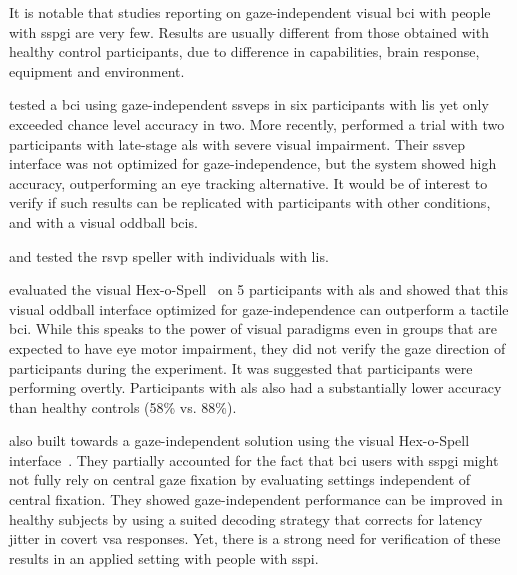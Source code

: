 \documentclass[twocolumn]{article}
\begin{document}
It is notable that studies reporting on
gaze-independent visual \ac{bci} with people with \ac{sspgi} are very few.
Results are usually different from those obtained with healthy control
participants, due to difference in capabilities, brain
response, equipment and environment.

\textcite{Lesenfants2014} tested a \ac{bci} using gaze-independent \acp{ssvep} in six
participants with \ac{lis} yet only exceeded chance level accuracy in two.
More recently, \textcite{Peters2020} performed a trial with two
participants with late-stage \ac{als} with severe visual impairment.
Their \ac{ssvep} interface was not optimized for gaze-independence, but the
system showed high accuracy, outperforming an eye tracking alternative.
It would be of interest to verify if such results can be replicated with
participants with other conditions, and with a visual oddball \acp{bci}.

\textcite{Orhan2012} and \textcite{Oken2014} tested the \ac{rsvp} speller with
individuals with \ac{lis}.

\textcite{Severens2014} evaluated the visual Hex-o-Spell~\cite{Treder2010} on 5
participants with \ac{als} and showed that this visual oddball interface optimized
for gaze-independence can outperform a tactile \ac{bci}.
While this speaks to the power of visual paradigms even in groups that are
expected to have eye motor impairment, they did not verify the gaze direction
of participants during the experiment.
It was suggested that participants were performing overtly.
Participants with \ac{als} also had a substantially lower accuracy than healthy
controls (58\% vs. 88\%).

\textcite{VanDenKerchove2024} also built towards a gaze-independent solution
using the visual Hex-o-Spell interface~\cite{VanDenKerchove2024}.
They partially accounted for the fact that \ac{bci} users with \ac{sspgi} might
not fully rely on central gaze fixation by evaluating settings independent of
central fixation.
They showed gaze-independent performance can be improved in healthy subjects by
using a suited decoding strategy that corrects for latency jitter in covert \ac{vsa} responses.
Yet, there is a strong need for verification of these results in an applied
setting with people with \ac{sspi}.
\end{document}

